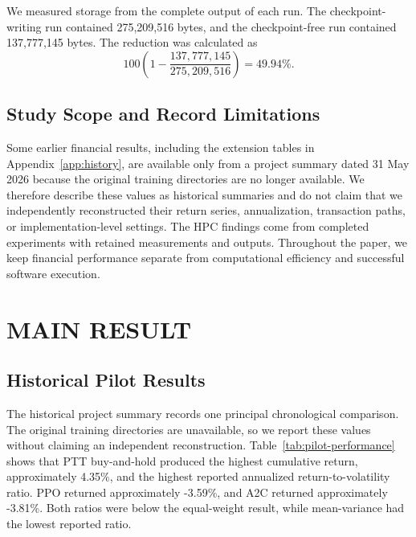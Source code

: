 \documentclass[12pt,a4paper,oneside]{book}
\theoremstyle{plain}
\numberwithin{equation}{chapter} \DeclareMathOperator{\Var}{Var}
\begin{document}
We measured storage from the complete output of each run. The checkpoint-writing run contained 275,209,516 bytes, and the checkpoint-free run contained 137,777,145 bytes. The reduction was calculated as
\begin{equation}
  100\left(1-\frac{137{,}777{,}145}{275{,}209{,}516}\right)=49.94\%.
  \label{eq:storage-reduction}
\end{equation}

\FloatBarrier


\section{Study Scope and Record Limitations}
Some earlier financial results, including the extension tables in Appendix~\ref{app:history}, are available only from a project summary dated 31 May 2026 because the original training directories are no longer available. We therefore describe these values as historical summaries and do not claim that we independently reconstructed their return series, annualization, transaction paths, or implementation-level settings. The HPC findings come from completed experiments with retained measurements and outputs. Throughout the paper, we keep financial performance separate from computational efficiency and successful software execution.
\FloatBarrier

\chapter{MAIN RESULT}
\label{chap:results}
\section{Historical Pilot Results}

The historical project summary records one principal chronological comparison. The original training directories are unavailable, so we report these values without claiming an independent reconstruction. Table~\ref{tab:pilot-performance} shows that PTT buy-and-hold produced the highest cumulative return, approximately 4.35\%, and the highest reported annualized return-to-volatility ratio. PPO returned approximately -3.59\%, and A2C returned approximately -3.81\%. Both ratios were below the equal-weight result, while mean-variance had the lowest reported ratio.
\end{document}
